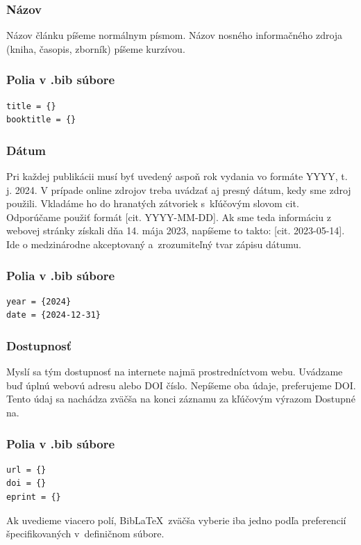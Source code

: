 \subsubsection*{Názov}
Názov článku píšeme normálnym písmom.
Názov nosného informačného zdroja (kniha, časopis, zborník) píšeme kurzívou.

\subsubsection*{\normalsize Polia v .bib súbore}
\begin{verbatim}
title = {}
booktitle = {}
\end{verbatim}

\subsubsection*{Dátum}
Pri každej publikácii musí byť uvedený aspoň rok vydania
vo formáte YYYY, t. j. 2024.
V prípade online zdrojov treba uvádzať aj presný dátum,
kedy sme zdroj použili.
Vkladáme ho do hranatých zátvoriek s~kľúčovým slovom cit.
Odporúčame použiť formát [cit. YYYY-MM-DD].
Ak sme teda informáciu z webovej stránky získali dňa
14. mája 2023,
napíšeme to takto: [cit. 2023-05-14].
Ide o medzinárodne akceptovaný a~zrozumiteľný tvar zápisu dátumu.

\subsubsection*{\normalsize Polia v .bib súbore}
\begin{verbatim}
year = {2024}
date = {2024-12-31}
\end{verbatim}

\subsubsection*{Dostupnosť}
Myslí sa tým dostupnosť na internete najmä prostredníctvom webu.
Uvádzame buď úplnú webovú adresu alebo DOI číslo.
Nepíšeme oba údaje, preferujeme DOI.
Tento údaj sa nachádza zväčša na konci záznamu za kľúčovým výrazom Dostupné na.

\subsubsection*{\normalsize Polia v .bib súbore}
\begin{verbatim}
url = {}
doi = {}
eprint = {}
\end{verbatim}
Ak uvedieme viacero polí, Bib\LaTeX\ zväčša vyberie iba jedno
podľa preferencií špecifikovaných v~definičnom súbore.

